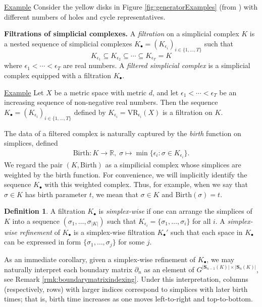 \documentclass[utf8]{formatting_stuff/frontiersFPHY}
\newcommand{\R}{\mathbb{R}}
\newcommand{\Simplices}[0]{\mathbf{S}}
\newcommand{\fig}{Figure }
\newcommand{\birth}{\mathrm{Birth}}
\newcommand{\simplex}{\sigma}
\theoremstyle{plain}
\theoremstyle{definition}
\newtheorem{definition}[theorem]{Definition}
\begin{document}
\noindent \underline{Example} Consider the yellow disks in \fig \ref{fig:generatorExamples} (from  \cite{Carlsson2009TopologyAD}) with different numbers of holes and cycle representatives. 


 

\noindent \textbf{Filtrations of simplicial complexes.} A \emph{filtration} on a simplicial complex $K$ is a nested sequence of  simplicial complexes $K_\bullet = (K_{\epsilon_i})_{i \in\{ 1, \ldots, T\}}$ such that
    $$
    K_{\epsilon_1} \subseteq K_{\epsilon_2} \subseteq \cdots \subseteq K_{\epsilon_T} = K
    $$
where $\epsilon_1 < \cdots < \epsilon_T$ are real numbers. A \emph{filtered simplicial complex} is a simplicial complex equipped with a filtration $K_\bullet$.

\noindent \underline{Example}
 Let  $X$ be a metric space with metric $d$, and let  $\epsilon_1 < \cdots < \epsilon_T$ be an increasing sequence of non-negative real numbers.  Then the sequence $K_\bullet = (K_{\epsilon_i})_{i \in\{ 1, \ldots, T\}}$ defined by $K_{\epsilon_i} = \text{VR}_{\epsilon_i}(X)$ is a filtration on $K$.

The data of a filtered complex is naturally captured by the \emph{birth} function on simplices, defined
    \begin{align*}
        \birth: K \to \R, \; \simplex \mapsto \min\{ \epsilon_i : \simplex \in K_{\epsilon_i} \}.
    \end{align*}
We regard the pair $(K, \birth)$ as a simpilicial complex whose simplices are weighted by the birth function.   For convenience, we will implicitly identify the sequence $K_\bullet$ with this weighted complex.   Thus, for example, when we say that $\simplex \in K$ has birth parameter $t$, we mean that  $\sigma\in K$ and  $\birth(\sigma) = t$.


\begin{definition}
A filtration $K_\bullet$ is \emph{simplex-wise} if one can arrange the simplices of $K$ into a sequence $(\simplex_1, \ldots, \simplex_{|K|})$ such that $K_{\epsilon_i} = \{\simplex_1, \ldots, \simplex_i\}$ for all $i$.  
A \emph{simplex-wise refinement}  of $K_\bullet$ is a simplex-wise filtration $K_\bullet'$ such that each space in $K_\bullet$ can be expressed in form $\{\simplex_1, \ldots, \simplex_j\}$ for some $j$.
\end{definition}
 


 

As an immediate corollary, given a simplex-wise refinement of $K_\bullet$, we may naturally interpret each boundary matrix $\partial_n$ as an element of $G^{|\Simplices_{n-1}(K)| \times |\Simplices_{n}(K)|}$, see Remark \ref{rmk:boundarymatrixindexing}.  Under this interpretation, columns (respectively, rows) with larger indices correspond to simplices with later birth times; that is, birth time increases as one moves left-to-right and top-to-bottom.  
\end{document}

